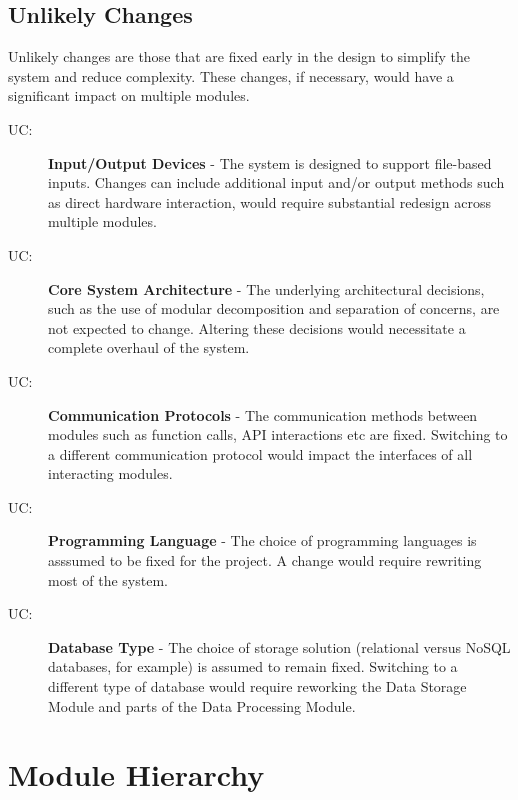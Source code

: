 \documentclass[12pt, titlepage]{article}
\newcounter{ucnum}
\newcommand{\uctheucnum}{UC\theucnum}
\begin{document}
\subsection{Unlikely Changes} \label{SecUchange}

Unlikely changes are those that are fixed early in the design to simplify the system
and reduce complexity. These changes, if necessary, would have a significant impact on
multiple modules.

\begin{description}
  \item[ \uctheucnum \label{ucIO}:] \textbf{Input/Output Devices} - 
  The system is designed to support file-based inputs. Changes can include additional input
  and/or output methods such as direct hardware interaction, would require substantial
  redesign across multiple modules.
  
  \item[ \uctheucnum \label{ucSysArch}:] \textbf{Core System Architecture} -
  The underlying architectural decisions, such as the use of modular decomposition and separation
  of concerns, are not expected to change. Altering these decisions would necessitate a complete overhaul
  of the system.
  
  \item[ \uctheucnum \label{ucComms}:] \textbf{Communication Protocols} -
  The communication methods between modules such as function calls, API interactions etc are fixed. 
  Switching to a different communication protocol would impact the interfaces of all interacting modules.

  \item[ \uctheucnum \label{ucLanguage}:] \textbf{Programming Language} -
  The choice of programming languages is asssumed to be fixed for the project. A change would
  require rewriting most of the system.

  \item[ \uctheucnum \label{ucDatabase}:] \textbf{Database Type} -
  The choice of storage solution (relational versus NoSQL databases, for example) is assumed to remain
  fixed. Switching to a different type of database would require reworking the Data Storage
  Module and parts of the Data Processing Module.

\end{description}

\section{Module Hierarchy} \label{SecMH}
\end{document}

